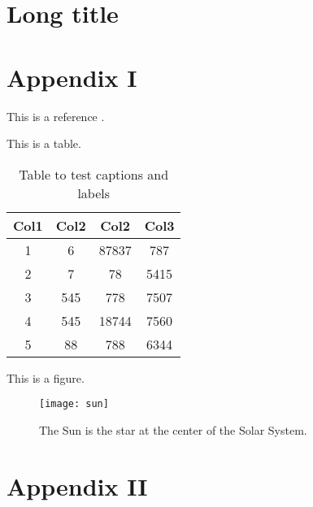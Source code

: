 \begin{refsection} %
\chapter[Short title]{Long title}


\printbibliography[heading=subbibliography, title={References}] %

\begin{appendices}
	\chapter{Appendix I}
	This is a reference \cite{Al_Amin_1996}.
	
	This is a table. 
	
	\begin{table}[h!]
		\centering
		\begin{tabular}{||c c c c||} 
			\hline
			Col1 & Col2 & Col2 & Col3 \\ [0.5ex] 
			\hline\hline
			1 & 6 & 87837 & 787 \\ 
			2 & 7 & 78 & 5415 \\
			3 & 545 & 778 & 7507 \\
			4 & 545 & 18744 & 7560 \\
			5 & 88 & 788 & 6344 \\ [1ex] 
			\hline
		\end{tabular}
		\caption{Table to test captions and labels}
		\label{table:3}
	\end{table}

	This is a figure.
	
	\begin{figure}[ht]
		\centering
		\texttt{[image: sun]}
		\caption[The sun]{The Sun is the star at the center of the Solar System.}
		\centering
		\label{fig:2}
	\end{figure}
	

	
	\chapter{Appendix II}
\end{appendices}

\end{refsection}